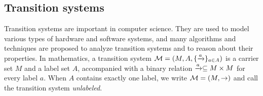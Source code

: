 \documentclass{amsart}
\begin{document}


%

\subsection{Transition systems}
\label{sec_transition_systems}


Transition systems are important in computer science.
They are used to model
various types of hardware and software systems,
and many algorithms and techniques are proposed to analyze transition systems
and to reason about their properties.
In mathematics, a transition system $\mathcal{M} = (M, A, \{\xrightarrow{a}\}_{a \in A})$ is
a carrier set $M$ and a label set $A$, 
accompanied with a binary relation $\xrightarrow{a} \subseteq M \times M$
for every label $a$.
When $A$ contains exactly one label, we write $\mathcal{M} = (M, \to)$ 
and call the transition system \emph{unlabeled}.
\end{document}

